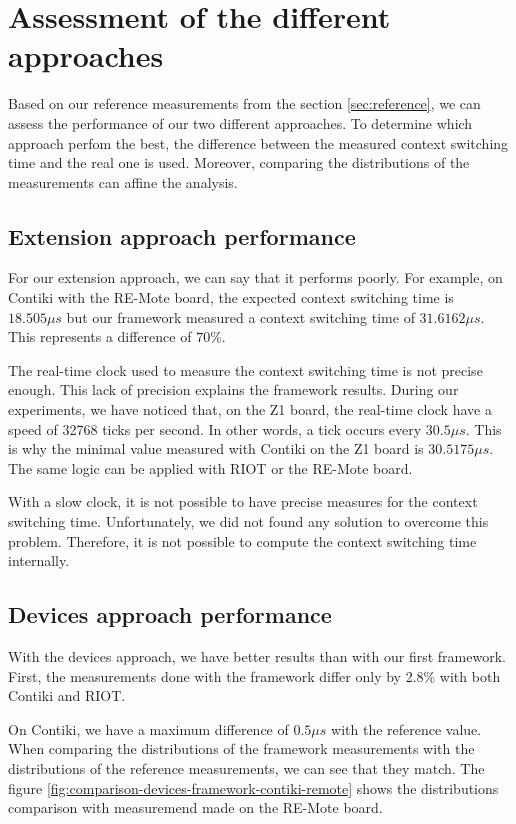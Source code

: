 \section{Assessment of the different approaches}

Based on our reference measurements from the section \ref{sec:reference}, we can assess the performance of our two different approaches.
To determine which approach perfom the best, the difference between the measured context switching time and the real one is used.
Moreover, comparing the distributions of the measurements can affine the analysis.

\subsection{Extension approach performance}

For our extension approach, we can say that it performs poorly.
For example, on Contiki with the RE-Mote board, the expected context switching time is $18.505\mu s$ but our framework measured a context switching time of $31.6162\mu s$.
This represents a difference of $70\%$.

The real-time clock used to measure the context switching time is not precise enough.
This lack of precision explains the framework results.
During our experiments, we have noticed that, on the Z1 board, the real-time clock have a speed of 32768 ticks per second.
In other words, a tick occurs every $30.5\mu s$.
This is why the minimal value measured with Contiki on the Z1 board is $30.5175\mu s$.
The same logic can be applied with RIOT or the RE-Mote board.

With a slow clock, it is not possible to have precise measures for the context switching time.
Unfortunately, we did not found any solution to overcome this problem.
Therefore, it is not possible to compute the context switching time internally.

\subsection{Devices approach performance}

With the devices approach, we have better results than with our first framework.
First, the measurements done with the framework differ only by 2.8\% with both Contiki and RIOT.

On Contiki, we have a maximum difference of $0.5\mu s$ with the reference value.
When comparing the distributions of the framework measurements with the distributions of the reference measurements, we can see that they match.
The figure \ref{fig:comparison-devices-framework-contiki-remote} shows the distributions comparison with measuremend made on the RE-Mote board.

